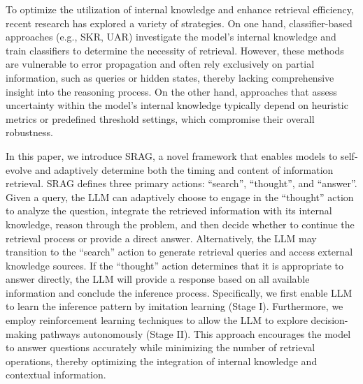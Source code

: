 To optimize the utilization of internal knowledge and enhance retrieval efficiency, recent research has explored a variety of strategies. On one hand, classifier-based approaches (e.g., SKR, UAR) investigate the model's internal knowledge and train classifiers to determine the necessity of retrieval. However, these methods are vulnerable to error propagation and often rely exclusively on partial information, such as queries or hidden states, thereby lacking comprehensive insight into the reasoning process. On the other hand, approaches that assess uncertainty within the model’s internal knowledge typically depend on heuristic metrics or predefined threshold settings, which compromise their overall robustness.




In this paper, we introduce SRAG, a novel framework that enables models to self-evolve and adaptively determine both the timing and content of information retrieval. SRAG defines three primary actions: ``search'', ``thought'', and ``answer''.
Given a query, the LLM can adaptively choose to engage in the ``thought'' action to analyze the question, integrate the retrieved information with its internal knowledge, reason through the problem, and then decide whether to continue the retrieval process or provide a direct answer.
Alternatively, the LLM may transition to the ``search'' action to generate retrieval queries and access external knowledge sources.
If the ``thought'' action determines that it is appropriate to answer directly, the LLM will provide a response based on all available information and conclude the inference process.
% 
Specifically, we first enable LLM to learn the inference pattern by imitation learning (Stage I). 
Furthermore, we employ reinforcement learning techniques to allow the LLM to explore decision-making pathways autonomously (Stage II). 
This approach encourages the model to answer questions accurately while minimizing the number of retrieval operations, thereby optimizing the integration of internal knowledge and contextual information.


